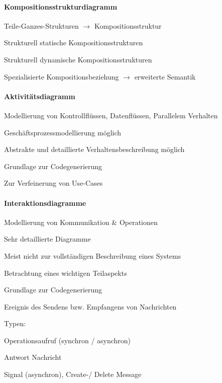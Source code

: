 \documentclass[a4paper]{article}
\begin{document}
\begin{multicols}{3}
  \paragraph{Kompositionsstrukturdiagramm}
  \begin{itemize*}
    \item Teile-Ganzes-Strukturen $\rightarrow$ Kompositionsstruktur
    \item Strukturell statische Kompositionsstrukturen
    \item Strukturell dynamische Kompositionsstrukturen
    \item Spezialisierte Kompositionsbeziehung $\rightarrow$ erweiterte Semantik
  \end{itemize*}

  \paragraph{Aktivitätsdiagramm}
  \begin{itemize*}
    \item Modellierung von Kontrollflüssen, Datenflüssen, Parallelem Verhalten
    \item Geschäftsprozessmodellierung möglich
    \item Abstrakte und detaillierte Verhaltensbeschreibung möglich
    \item Grundlage zur Codegenerierung
    \item Zur Verfeinerung von Use-Cases
  \end{itemize*}

  \paragraph{Interaktionsdiagramme}
  \begin{itemize*}
    \item Modellierung von Kommunikation \& Operationen
    \item Sehr detaillierte Diagramme
    \item Meist nicht zur vollständigen Beschreibung eines Systems
    \item Betrachtung eines wichtigen Teilaspekts
    \item Grundlage zur Codegenerierung
    \item Ereignis des Sendens bzw. Empfangens von Nachrichten
    \item Typen:
    \begin{itemize*}
      \item Operationsaufruf (synchron / asynchron)
      \item Antwort Nachricht
      \item Signal (asynchron), Create-/ Delete Message
    \end{itemize*}
  \end{itemize*}


\end{multicols}
\end{document}
